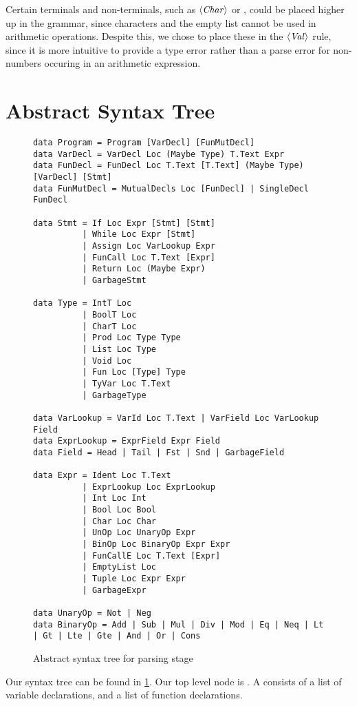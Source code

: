 Certain terminals and non-terminals, such as $\langle \textit{Char}\kern.7pt \rangle$ or \code{[]}, could be
placed higher up in the grammar, since characters and the empty list cannot be
used in arithmetic operations. Despite this, we chose to place these in the
$\langle \textit{Val}\kern.7pt \rangle$ rule, since it is more intuitive to provide a type error rather than
a parse error for non-numbers occuring in an arithmetic expression.


\section{Abstract Syntax Tree}

\begin{figure}
\begin{verbatim}
data Program = Program [VarDecl] [FunMutDecl]
data VarDecl = VarDecl Loc (Maybe Type) T.Text Expr
data FunDecl = FunDecl Loc T.Text [T.Text] (Maybe Type) [VarDecl] [Stmt]
data FunMutDecl = MutualDecls Loc [FunDecl] | SingleDecl FunDecl

data Stmt = If Loc Expr [Stmt] [Stmt]
          | While Loc Expr [Stmt]
          | Assign Loc VarLookup Expr
          | FunCall Loc T.Text [Expr]
          | Return Loc (Maybe Expr)
          | GarbageStmt

data Type = IntT Loc
          | BoolT Loc
          | CharT Loc
          | Prod Loc Type Type
          | List Loc Type
          | Void Loc
          | Fun Loc [Type] Type
          | TyVar Loc T.Text
          | GarbageType

data VarLookup = VarId Loc T.Text | VarField Loc VarLookup Field
data ExprLookup = ExprField Expr Field
data Field = Head | Tail | Fst | Snd | GarbageField

data Expr = Ident Loc T.Text
          | ExprLookup Loc ExprLookup
          | Int Loc Int
          | Bool Loc Bool
          | Char Loc Char
          | UnOp Loc UnaryOp Expr
          | BinOp Loc BinaryOp Expr Expr
          | FunCallE Loc T.Text [Expr]
          | EmptyList Loc
          | Tuple Loc Expr Expr
          | GarbageExpr

data UnaryOp = Not | Neg
data BinaryOp = Add | Sub | Mul | Div | Mod | Eq | Neq | Lt | Gt | Lte | Gte | And | Or | Cons
\end{verbatim}
	\caption{Abstract syntax tree for parsing stage}
  \label{fig:parse-ast}
\end{figure}

Our syntax tree can be found in \cref{fig:parse-ast}. Our top level node is
. A  consists of a
list of variable declarations, and a list of function declarations.

